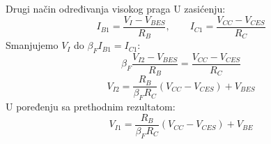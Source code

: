 \begin{frame}[label=10-s019]{Drugi način određivanja visokog praga}
\setlength{\abovedisplayskip}{4pt}\setlength{\belowdisplayskip}{4pt}\setlength{\abovedisplayshortskip}{3pt}\setlength{\belowdisplayshortskip}{3pt}
U zasićenju:
\[I_{B1}=\frac{V_I-V_{BES}}{R_B},\qquad I_{C1}=\frac{V_{CC}-V_{CES}}{R_C}\]
Smanjujemo $V_I$ do $\beta_FI_{B1}=I_{C1}$:
\[\beta_F\frac{V_{I2}-V_{BES}}{R_B}=\frac{V_{CC}-V_{CES}}{R_C}\]
\[V_{I2}=\frac{R_B}{\beta_FR_C}(V_{CC}-V_{CES})+V_{BES}\]
U poređenju sa prethodnim rezultatom:
\[V_{I1}=\frac{R_B}{\beta_FR_C}(V_{CC}-V_{CES})+V_{BE}\]
\end{frame}
